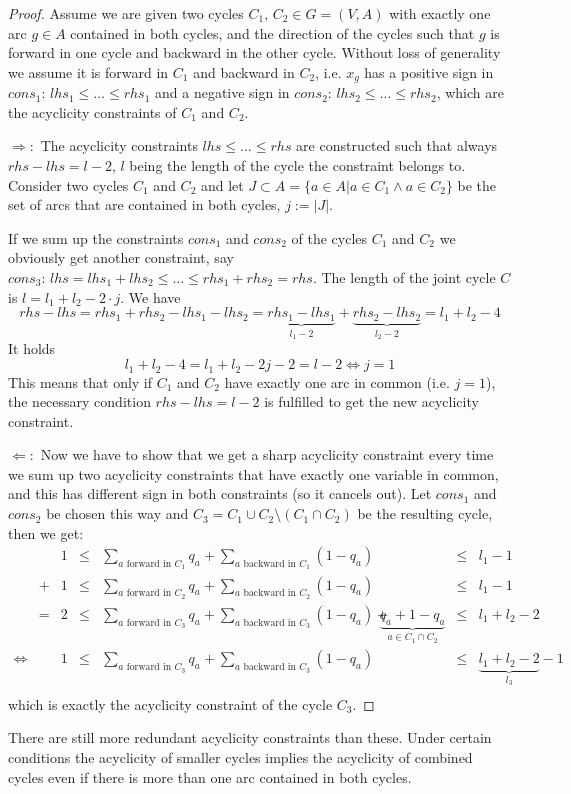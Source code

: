 \begin{proof}
 Assume we are given two cycles $C_1,\,C_2\in G=(V,A)$ with exactly one arc $g\in A$ 
contained in both cycles, and the direction of the cycles such that $g$ is forward in one cycle and backward in the 
other cycle. Without loss of generality we assume it is forward in $C_1$ and backward in $C_2$, i.e. $x_g$ has a 
positive sign in $cons_1:\,lhs_1\le \dots\le rhs_1$ and a negative sign in $cons_2:\, lhs_2\le \dots\le rhs_2$, which 
are the acyclicity constraints of $C_1$ and $C_2$. 

$\Rightarrow :$ 
The acyclicity constraints $lhs \le \dots\le rhs$ are constructed such that always $rhs-lhs=l-2$, $l$ being the length 
of the cycle the constraint belongs to. Consider two cycles $C_1$ and $C_2$ and let $J\subset A=\{a\in A|a\in C_1 
\land a\in C_2 \}$ be the set of arcs that are contained in both cycles, $j:=|J|$. 

If we sum up the constraints $cons_1$ and $cons_2$ of the cycles $C_1$ and $C_2$ we obviously get another constraint,
say $cons_3:\, lhs=lhs_1+lhs_2\le\dots\le rhs_1+rhs_2=rhs$. The length of the joint cycle $C$ is $l=l_1+l_2-2\cdot j$. 
We have 
$$rhs-lhs=rhs_1+rhs_2-lhs_1-lhs_2=\underbrace{rhs_1-lhs_1}_{l_1-2}+\underbrace{rhs_2-lhs_2}_{l_2-2}=l_1+l_2-4$$
It holds
$$l_1+l_2-4=l_1+l_2-2j-2=l-2 \iff j=1$$ 
This means that only if $C_1$ and $C_2$ have exactly one arc in common (i.e. $j=1$), the necessary condition 
$rhs-lhs=l-2$ is fulfilled to get the new acyclicity constraint.

$\Leftarrow :$ Now we have to show that we get a sharp acyclicity constraint every time we sum up two acyclicity 
constraints that have exactly one variable in common, and this has different sign in both constraints (so it cancels 
out). Let $cons_1$ and $cons_2$ be chosen this way and $C_3=C_1\cup C_2\setminus (C_1\cap C_2)$ be the resulting cycle, 
then we get:
\begin{align*}
 &&1&\le &\sum_{a \textrm{ forward in }C_1}q_a + \sum_{a\textrm{ backward in }C_1}{(1-q_a)}&&\le &l_1-1\\
 &+&1&\le &\sum_{a \textrm{ forward in }C_2}q_a + \sum_{a\textrm{ backward in }C_2}{(1-q_a)}&&\le &l_1-1\\
 &=&2&\le &\sum_{a \textrm{ forward in }C_3}q_a +\sum_{a\textrm{ backward in }C_3}{(1-q_a)}+
 &\underbrace{q_a+1-q_a}_{a\in C_1\cap C_2} &\le &l_1+l_2-2\\
 \iff &&1&\le &\sum_{a \textrm{ forward in }C_3}q_a +\sum_{a\textrm{ backward in }C_3}{(1-q_a)}
 &&\le &\underbrace{l_1+l_2-2}_{l_3}-1\\
\end{align*}
which is exactly the acyclicity constraint of the cycle $C_3$.
\end{proof}
There are still more redundant acyclicity constraints than these. Under certain conditions the acyclicity of smaller 
cycles implies the acyclicity of combined cycles even if there is more than one arc contained in both cycles.


